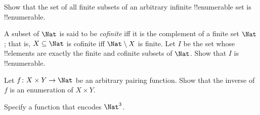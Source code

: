 \documentclass[../../../include/open-logic-section]{subfiles}
\begin{document}


\begin{prob}
Show that the set of all finite subsets of an arbitrary infinite
!!{enumerable} set is !!{enumerable}.
\end{prob}

\begin{prob}
A subset of $\Nat$ is said to be \emph{cofinite} iff it is the complement of a finite set $\Nat$; that is, $X \subseteq \Nat$ is cofinite iff $\Nat\setminus X$ is finite. Let
$I$ be the set whose !!{element}s are exactly the finite and cofinite subsets of $\Nat$. Show that $I$ is !!{enumerable}.
\end{prob}


\begin{prob}
Let $f \colon X \times Y \to \Nat$ be an arbitrary pairing function. Show that the inverse of $f$ is an enumeration of $X \times Y$.
\end{prob}

\begin{prob}
Specify a function that encodes $\Nat^3$.
\end{prob}
\end{document}
